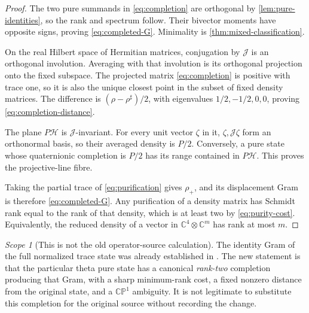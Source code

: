 \documentclass[11pt]{article}
\theoremstyle{definition}
\theoremstyle{remark}
\newtheorem{scope}[scope]{Scope}
\newcommand{\C}{\mathbb C}
\newcommand{\HH}{\mathcal H}
\newcommand{\Jq}{\mathcal J}
\begin{document}
\begin{proof}
The two pure summands in \eqref{eq:completion} are orthogonal by
\cref{lem:pure-identities}, so the rank and spectrum follow. Their bivector
moments have opposite signs, proving \eqref{eq:completed-G}. Minimality is
\cref{thm:mixed-classification}.

On the real Hilbert space of Hermitian matrices, conjugation by $\Jq$ is an
orthogonal involution. Averaging with that involution is its orthogonal
projection onto the fixed subspace. The projected matrix \eqref{eq:completion}
is positive with trace one, so it is also the unique closest point in the
subset of fixed density matrices. The difference is
$(\rho-\rho^\sharp)/2$, with eigenvalues $1/2,-1/2,0,0$, proving
\eqref{eq:completion-distance}.

The plane $P\HH$ is $\Jq$-invariant. For every unit vector $\zeta$ in it,
$\zeta,\Jq\zeta$ form an orthonormal basis, so their averaged density is
$P/2$. Conversely, a pure state whose quaternionic completion is $P/2$ has
its range contained in $P\HH$. This proves the projective-line fibre.

Taking the partial trace of \eqref{eq:purification} gives $\rho_+$, and its
displacement Gram is therefore \eqref{eq:completed-G}. Any purification of a
density matrix has Schmidt rank equal to the rank of that density, which
is at least two by \eqref{eq:purity-cost}. Equivalently, the reduced density
of a vector in $\C^4\otimes\C^m$ has rank at most $m$.
\end{proof}

\begin{scope}[This is not the old operator-source calculation]
The identity Gram of the full normalized trace state was already established
in \cite{AD9}. The new statement is that the particular theta pure state has
a canonical \emph{rank-two} completion producing that Gram, with a sharp
minimum-rank cost, a fixed nonzero distance from the original state, and a
$\mathbb{CP}^1$ ambiguity. It is not legitimate to substitute this completion
for the original source without recording the change.
\end{scope}
\end{document}
